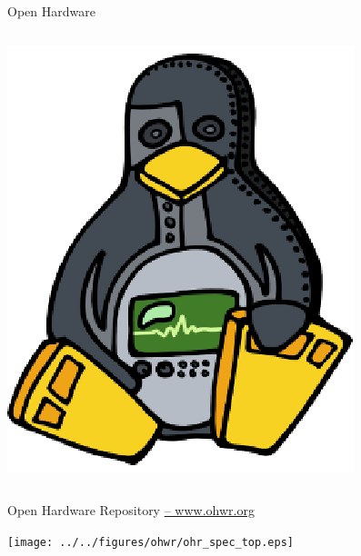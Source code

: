 \documentclass[compress,red]{beamer}
\begin{document}
\begin{frame}{Open Hardware}
\begin{columns}[c]
    \begin{center}
      \includegraphics[width=1.0\textwidth]{../../figures/ohwr/ohr_logo.eps}  
    \end{center}

  \end{columns}
\end{frame}
\begin{frame}{Open Hardware Repository \href{http://ohwr.org}{-- www.ohwr.org}}

 \begin{center}
   \texttt{[image: ../../figures/ohwr/ohr\_spec\_top.eps]}
 \end{center} 

\end{frame}
\end{document}
